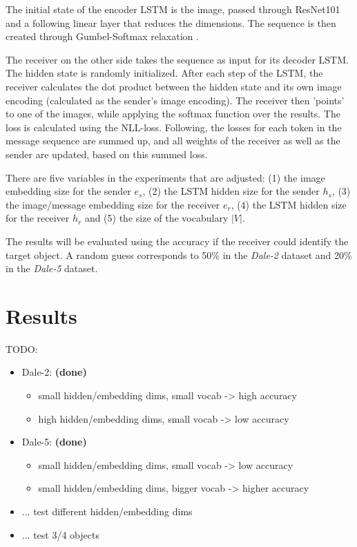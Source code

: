 \documentclass[11pt]{article}
\begin{document}
The initial state of the encoder LSTM is the image, passed through ResNet101 and a following linear layer that reduces the dimensions.
The sequence is then created through Gumbel-Softmax relaxation \citep{Jang2016}.

The receiver on the other side takes the sequence as input for its decoder LSTM.
The hidden state is randomly initialized.
After each step of the LSTM, the receiver calculates the dot product between the hidden state and its own image encoding (calculated as the sender's image encoding).
The receiver then 'points' to one of the images, while applying the softmax function over the results.
The loss is calculated using the NLL-loss.
Following, the losses for each token in the message sequence are summed up, and all weights of the receiver as well as the sender are updated, based on this summed loss.

There are five variables in the experiments that are adjusted:
(1) the image embedding size for the sender $e_s$, (2) the LSTM hidden size for the sender $h_s$, (3) the image/message embedding size for the receiver $e_r$, (4) the LSTM hidden size for the receiver $h_r$ and (5) the size of the vocabulary $|V|$.

The results will be evaluated using the accuracy if the receiver could identify the target object.
A random guess corresponds to 50\% in the \emph{Dale-2} dataset and 20\% in the \emph{Dale-5} dataset.

\section{Results}
TODO:
\begin{itemize}
  \item Dale-2: \textbf{(done)}
        \begin{itemize}
          \item small hidden/embedding dims, small vocab -> high accuracy
          \item high hidden/embedding dims, small vocab -> low accuracy
        \end{itemize}
  \item Dale-5: \textbf{(done)}
        \begin{itemize}
          \item small hidden/embedding dims, small vocab -> low accuracy
          \item small hidden/embedding dims, bigger vocab -> higher accuracy
        \end{itemize}
  \item ... test different hidden/embedding dims
  \item ... test 3/4 objects
\end{itemize}
\end{document}
